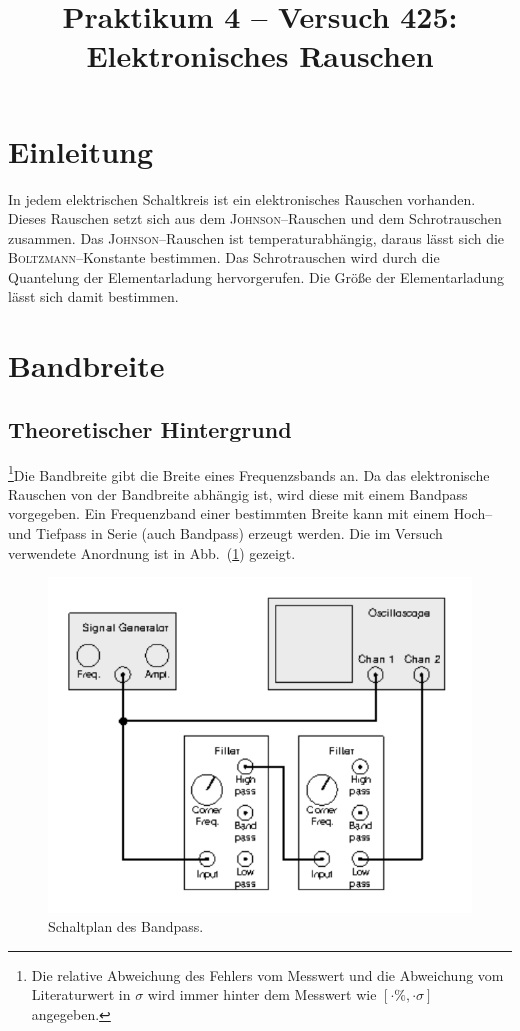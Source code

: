 \documentclass[sn-mathphys-num,iicol]{sn-jnl}
\theoremstyle{thmstyleone}
\theoremstyle{thmstyletwo}
\theoremstyle{thmstylethree}
\begin{document}
\title[]{Praktikum 4 -- Versuch 425: Elektronisches Rauschen}
\author*[1]{ }
\author*[1]{ }

\maketitle

\section{Einleitung}
In jedem elektrischen Schaltkreis ist ein elektronisches Rauschen vorhanden.
Dieses Rauschen setzt sich aus dem \textsc{Johnson}--Rauschen und dem Schrotrauschen zusammen. %
Das \textsc{Johnson}--Rauschen ist temperaturabhängig, daraus lässt sich die \textsc{Boltzmann}--Konstante bestimmen.
Das Schrotrauschen wird durch die Quantelung der Elementarladung hervorgerufen.
Die Größe der Elementarladung lässt sich damit bestimmen.

\section{Bandbreite}
\subsection{Theoretischer Hintergrund}
\footnote{Die relative Abweichung des Fehlers vom Messwert und die Abweichung vom Literaturwert in $\sigma $ wird immer hinter dem Messwert wie $[\cdot \%,\cdot \sigma ]$ angegeben.}Die Bandbreite gibt die Breite eines Frequenzsbands an.
Da das elektronische Rauschen von der Bandbreite abhängig ist, wird diese mit einem Bandpass vorgegeben.
Ein Frequenzband einer bestimmten Breite kann mit einem Hoch-- und Tiefpass in Serie (auch Bandpass) erzeugt werden.
Die im Versuch verwendete Anordnung ist in Abb.\ (\ref{fig:schaltplan_bandpass}) gezeigt.

\begin{figure}[t]
	\centering
	\includegraphics[width=.5\textwidth]{425_schaltplan_bandpass.png}
	\caption{Schaltplan des Bandpass.\cite{anleitung425}} \label{fig:schaltplan_bandpass}
\end{figure}
\end{document}
